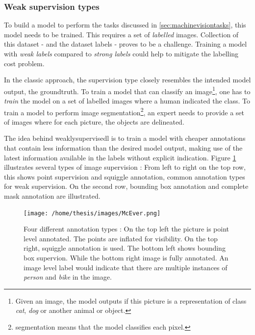 \subsubsection{Weak supervision types\label{sec:weak_supervision}}
\par{
    To build a model to perform the tasks discussed in \ref{sec:machinevisiontasks}, this model needs to be trained.
    This requires a set of \textit{labelled} images.
    Collection of this dataset - and the dataset labels - proves to be a challenge. 
    Training a model with \textit{weak labels} compared to \textit{strong labels} could help to mitigate the labelling cost problem.
}
\par{
    In the classic approach, the supervision type closely resembles the intended model output, the \Gls{groundtruth}.
    To train a model that can classify an image\footnote{Given an image, the model outputs if this picture is a representation of class \textit{cat}, \textit{dog} or another animal or object. }, 
    one has to \textit{train} the model on a set of labelled images where a human indicated the class.
    To train a model to perform image segmentation\footnote{segmentation means that the model classifies each pixel.}, an expert needs to provide a set of images where for each picture, the objects are delineated.  
}
\par{
    The idea behind \Gls{weaklysupervisedl} is to train a model with cheaper annotations that contain less information than the desired model output, 
    making use of the latest information available in the labels without explicit indication.
    Figure \ref{fig:ImageLabelTypes} illustrates several types of image supervision : 
    From left to right on the top row, this shows point supervision and squiggle annotation, common annotation types for weak supervision.
    On the second row, bounding box annotation and complete mask annotation are illustrated.
}

\begin{figure}
    \centering
    \texttt{[image: /home/thesis/images/McEver.png]}
    \caption{Four different annotation types \cite{McEver2020}: 
    On the top left the picture is point level annotated. The points are inflated for visibility.
    On the top right, squiggle annotation is used.
    The bottom left shows bounding box supervion.
    While the bottom right image is fully annotated.
    An image level label would indicate that there are multiple instances of \textit{person} and \textit{bike} in the image.
    \label{fig:ImageLabelTypes}}
\end{figure}

